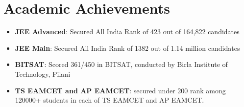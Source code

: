 \documentclass[letterpaper,11pt]{article}
\makeatletter
\newcommand{\resumeItem}[2]{
  \item\small{
    \textbf{#1}{: #2 \vspace{-2pt}}
  }
}
\newcommand{\resumeSubheading}[4]{
  \vspace{-1pt}\item
    \begin{tabular*}{0.97\textwidth}{l@{\extracolsep{\fill}}r}
      \textbf{#1} & #2 \\
      \textit{\small#3} & \textit{\small #4} \\
    \end{tabular*}\vspace{-5pt}
}
\newcommand{\resumeSubItem}[2]{\resumeItem{#1}{#2}\vspace{-4pt}}
\newcommand{\resumeSubHeadingListStart}{\begin{itemize}[leftmargin=*]}
\newcommand{\resumeSubHeadingListEnd}{\end{itemize}}
\newcommand{\resumeItemListStart}{\begin{itemize}}
\newcommand{\resumeItemListEnd}{\end{itemize}\vspace{-5pt}}
\makeatother
\begin{document}



\section{Academic Achievements}
  \resumeSubHeadingListStart
    \resumeSubItem{JEE Advanced}
      {Secured All India Rank of 423 out of 164,822 candidates}
    \resumeSubItem{JEE Main}
      {Secured All India Rank of 1382 out of 1.14 million candidates}
    \resumeSubItem{BITSAT}
      {Scored 361/450 in BITSAT, conducted by Birla Institute of Technology, Pilani}
    \resumeSubItem{TS EAMCET and AP EAMCET}
        {secured under 200 rank among 120000+ students in each of TS EAMCET and AP EAMCET.}
    
    \resumeSubHeadingListEnd
\end{document}
